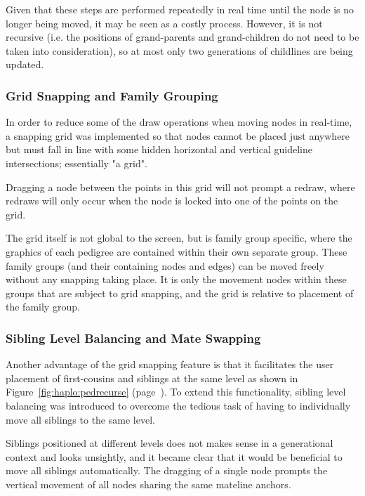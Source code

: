 Given that these steps are performed repeatedly in real time until the node is no longer being moved, it may be seen as a costly process. However, it is not recursive (i.e. the positions of grand-parents and grand-children do not need to be taken into consideration), so at most only two generations of childlines are being updated.

\subsubsection{Grid Snapping and Family Grouping}

In order to reduce some of the draw operations when moving nodes in real-time, a snapping grid was implemented so that nodes cannot be placed just anywhere but must fall in line with some hidden horizontal and vertical guideline intersections; essentially "a grid". 

Dragging a node between the points in this grid will not prompt a redraw, where redraws will only occur when the node is locked into one of the points on the grid.  

The grid itself is not global to the screen, but is family group specific, where the graphics of each pedigree are contained within their own separate group. These family groups (and their containing nodes and edges) can be moved freely without any snapping taking place. It is only the movement nodes within these groups that are subject to grid snapping, and the grid is relative to placement of the family group.

\subsubsection{Sibling Level Balancing and Mate Swapping}

Another advantage of the grid snapping feature is that it facilitates the user placement of first-cousins and siblings at the same level as shown in Figure~\ref{fig:haplo:pedrecurse} (page~\pageref{fig:haplo:pedrecurse}). 
To extend this functionality,  sibling level balancing was introduced to overcome the tedious task of having to individually move all siblings to the same level. 

Siblings positioned at different levels does not makes sense in a generational context and looks unsightly, and it became clear that it would be beneficial to move all siblings automatically. The dragging of a single node prompts the vertical movement of all nodes sharing the same mateline anchors. 

